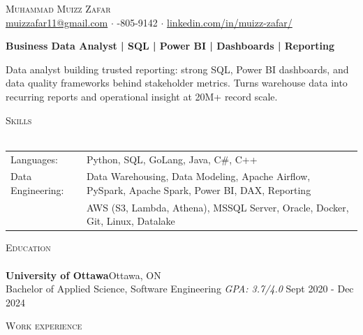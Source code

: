 \documentclass[a4paper]{article}
\newcommand{\lineunder} {
    \vspace*{-8pt} \\
    \hspace*{-18pt} \hrulefill \\
}
\newcommand{\header} [1] {
    {\hspace*{-18pt}\vspace*{6pt} \textsc{#1}}
    \vspace*{-6pt} \lineunder
}
\begin{document}
\vspace*{-40pt}

\vspace*{-10pt}
\begin{center}
	{\Huge \scshape {Muhammad Muizz Zafar}}\\
	\faSend \space \href{mailto:muizzafar11@gmail.com}{muizzafar11@gmail.com} $\cdot$ \faPhoneSquare {}-805-9142 $\cdot$ \faLinkedinSquare \space \href{https://www.linkedin.com/in/muizz-zafar/}{linkedin.com/in/muizz-zafar/}
	\\
\end{center}

\vspace{-5pt}
\begin{center}
\textbf{Business Data Analyst | SQL | Power BI | Dashboards | Reporting}
\end{center}
\begin{center}
Data analyst building trusted reporting: strong SQL, Power BI dashboards, and data quality frameworks behind stakeholder metrics. Turns warehouse data into recurring reports and operational insight at 20M+ record scale.
\end{center}

\header{Skills}
\begin{tabular}{ l l }
	Languages: 
& Python, SQL, GoLang, Java, C\#, C++ \\

Data Engineering: 
& Data Warehousing, Data Modeling, Apache Airflow, PySpark, Apache Spark, Power BI, DAX, Reporting\\
& AWS (S3, Lambda, Athena), MSSQL Server, Oracle, Docker, Git, Linux, Datalake

\end{tabular}

\header{Education}
\textbf{University of Ottawa}\hfill Ottawa, ON\\
Bachelor of Applied Science, Software Engineering \textit{GPA: 3.7/4.0} \hfill Sept 2020 - Dec 2024\\
\vspace{2mm}

\header{Work experience}
\vspace{1.5mm}
\end{document}
